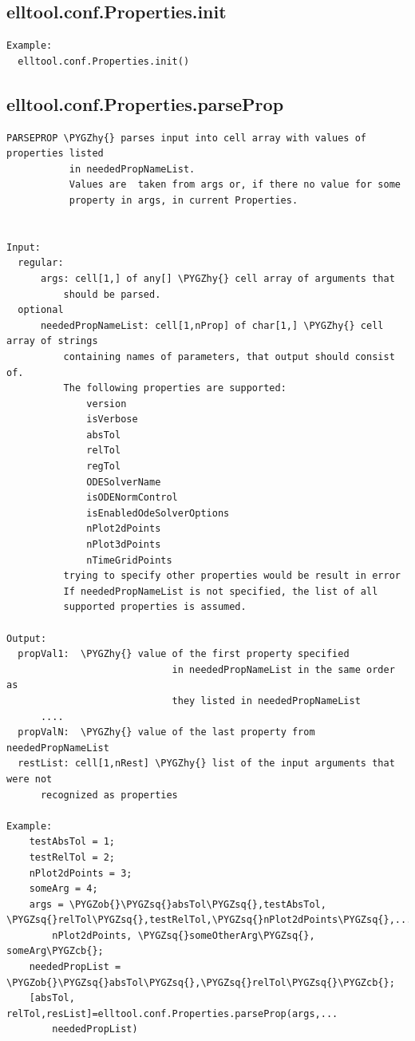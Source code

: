 \documentclass[letterpaper,10pt,english]{sphinxmanual}
\def\PYGZob{\char`\{}
\def\PYGZcb{\char`\}}
\def\PYGZhy{\char`\-}
\def\PYGZsq{\char`\'}
\begin{document}
\subsection{elltool.conf.Properties.init}
\label{chap_functions:elltool-conf-properties-init}
\begin{Verbatim}[commandchars=\\\{\}]
Example:
  elltool.conf.Properties.init()
\end{Verbatim}


\subsection{elltool.conf.Properties.parseProp}
\label{chap_functions:elltool-conf-properties-parseprop}
\begin{Verbatim}[commandchars=\\\{\}]
PARSEPROP \PYGZhy{} parses input into cell array with values of properties listed
           in neededPropNameList.
           Values are  taken from args or, if there no value for some
           property in args, in current Properties.


Input:
  regular:
      args: cell[1,] of any[] \PYGZhy{} cell array of arguments that
          should be parsed.
  optional
      neededPropNameList: cell[1,nProp] of char[1,] \PYGZhy{} cell array of strings
          containing names of parameters, that output should consist of.
          The following properties are supported:
              version
              isVerbose
              absTol
              relTol
              regTol
              ODESolverName
              isODENormControl
              isEnabledOdeSolverOptions
              nPlot2dPoints
              nPlot3dPoints
              nTimeGridPoints
          trying to specify other properties would be result in error
          If neededPropNameList is not specified, the list of all
          supported properties is assumed.

Output:
  propVal1:  \PYGZhy{} value of the first property specified
                             in neededPropNameList in the same order as
                             they listed in neededPropNameList
      ....
  propValN:  \PYGZhy{} value of the last property from neededPropNameList
  restList: cell[1,nRest] \PYGZhy{} list of the input arguments that were not
      recognized as properties

Example:
    testAbsTol = 1;
    testRelTol = 2;
    nPlot2dPoints = 3;
    someArg = 4;
    args = \PYGZob{}\PYGZsq{}absTol\PYGZsq{},testAbsTol, \PYGZsq{}relTol\PYGZsq{},testRelTol,\PYGZsq{}nPlot2dPoints\PYGZsq{},...
        nPlot2dPoints, \PYGZsq{}someOtherArg\PYGZsq{}, someArg\PYGZcb{};
    neededPropList = \PYGZob{}\PYGZsq{}absTol\PYGZsq{},\PYGZsq{}relTol\PYGZsq{}\PYGZcb{};
    [absTol, relTol,resList]=elltool.conf.Properties.parseProp(args,...
        neededPropList)


\end{Verbatim}
\end{document}
